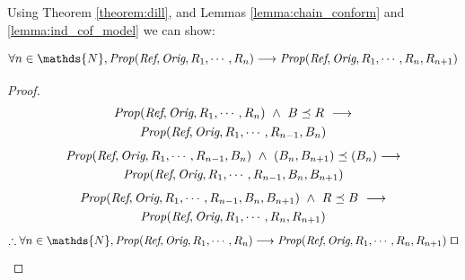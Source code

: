 \documentclass[runningheads]{llncs}
\newif\ifcomments
\newif\ifkylecomments
\newcommand{\egm}[1]{\ifcomments\textcolor{orange}{egm: #1}\fi}
\newcommand{\krs}[1]{\ifkylecomments\textcolor{blue}{krs: #1}\fi}
\begin{document}
\krs{Yeah this was a mess. I wanted to present the lemmas in one order, but the proof for the first lemma relied on context from the proof for the second lemma so the sections had to be swapped. I reworked it to present the lemmas in the opposite order so it works out.\egm{Reference sections in order. Same with Lemmas etc. Also, through the entire paper, add a proof to each of the lemmas and statements that simple says "See section x" where x is the section where the proof lives. It's hard to keep track of where everything is eventually proved out.}}

\pagebreak
Using Theorem \ref{theorem:dill}, and Lemmas \ref{lemma:chain_conform} and \ref{lemma:ind_cof_model} we can show:


\begin{lemma}
\label{lemma:inductive_step}
$$
\forall n \in \mathds{N}, \mathit{Prop}(\emph{Ref}, \emph{Orig}, R_1, \dotsm, R_n) \longrightarrow \mathit{Prop}(\emph{Ref}, \emph{Orig}, R_1, \dotsm, R_n, R_{n+1})
$$
\begin{proof}\ \\
    \vspace*{-20pt}
    \begin{multline*}
    \mathit{Prop}(\emph{Ref}, \emph{Orig}, R_1, \dotsm, R_n)\ \wedge\  B \preceq R\ \longrightarrow \\
    \mathit{Prop}(\emph{Ref}, \emph{Orig}, R_1, \dotsm, R_{n-1}, B_n)
    \end{multline*}
    \vspace*{-25pt}
    \begin{multline*}
    \mathit{Prop}(\emph{Ref}, \emph{Orig}, R_1, \dotsm, R_{n-1}, B_n)\ \wedge\  (B_n, B_{n+1}) \preceq (B_n)
 \longrightarrow 
    \\    
    \mathit{Prop}(\emph{Ref}, \emph{Orig}, R_1, \dotsm, R_{n-1}, B_n, B_{n+1})
    \end{multline*}
    \vspace*{-25pt}
    \begin{multline*}
    \mathit{Prop}(\emph{Ref}, \emph{Orig}, R_1, \dotsm, R_{n-1}, B_n, B_{n+1})\ \wedge\ R \preceq B\ \longrightarrow
    \\
    \mathit{Prop}(\emph{Ref}, \emph{Orig}, R_1, \dotsm, R_n, R_{n+1})
    \end{multline*}
    \vspace*{-25pt}
    \begin{multline*}
    \therefore  \forall n \in \mathds{N}, \mathit{Prop}(\emph{Ref}, \emph{Orig}, R_1, \dotsm, R_n) \longrightarrow \mathit{Prop}(\emph{Ref}, \emph{Orig}, R_1, \dotsm, R_n, R_{n+1})\ \qed
    \end{multline*}
\end{proof}
\end{lemma}
\end{document}
